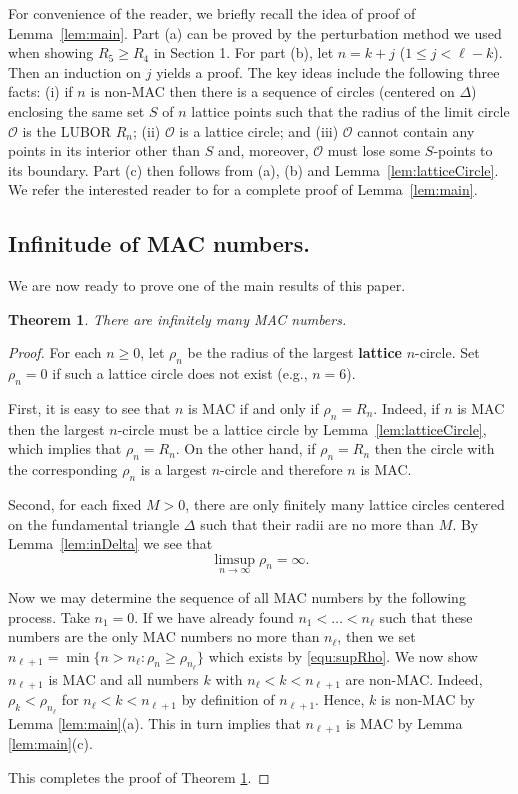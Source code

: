 \documentclass{article}
\theoremstyle{theorem}
\newtheorem{theorem}{Theorem}
\theoremstyle{definition}
\begin{document}
For convenience of the reader, we briefly recall the idea of proof of Lemma~\ref{lem:main}.
Part (a) can be proved by the perturbation method we used when showing $R_5\ge R_4$ in Section 1. For part (b), let $n=k+j$ ($1\le j<\ell-k$). Then an induction on $j$ yields a proof. The key ideas include the following three facts: (i) if $n$ is non-MAC then there is a sequence of circles (centered on $\Delta$) enclosing the same set $S$ of $n$ lattice points such that the radius of the limit circle $\mathcal O$ is the LUBOR $R_n$; (ii) $\mathcal O$ is a lattice circle; and (iii) $\mathcal O$ cannot contain any points in its interior other than $S$ and, moreover, $\mathcal O$ must lose some $S$-points to its boundary. Part (c) then follows from (a), (b) and Lemma~\ref{lem:latticeCircle}. We refer the interested reader to \cite{Zhao2025Aug} for a complete proof of Lemma~\ref{lem:main}.


\subsection{Infinitude of MAC numbers.}
We are now ready to prove one of the main results of this paper.

\begin{theorem}\label{thm:infinityMAC}
There are infinitely many MAC numbers.
\end{theorem}

\begin{proof}
For each $n\ge 0$, let $\rho_n$ be the radius of the largest {\bf lattice} $n$-circle. Set $\rho_n=0$ if such a lattice circle does not exist (e.g., $n=6$).

First, it is easy to see that $n$ is MAC if and only if $\rho_n=R_n$. Indeed, if $n$ is MAC then the largest $n$-circle must be a lattice circle by Lemma~\ref{lem:latticeCircle}, which implies that $\rho_n=R_n$. On the other hand, if $\rho_n=R_n$ then the circle with the corresponding $\rho_n$ is a largest $n$-circle and therefore $n$ is MAC.

Second, for each fixed $M>0$, there are only finitely many lattice circles centered on the fundamental triangle $\Delta$ such that their radii are no more than $M$. By Lemma~\ref{lem:inDelta} we see that
\begin{equation}\label{equ:supRho}
\limsup_{n\to \infty}\rho_n=\infty.
\end{equation}

Now we may determine the sequence of all MAC numbers by the following process. Take $n_1=0$. If we have already found $n_1<\dots<n_\ell$ such that these numbers are the only MAC numbers no more than $n_\ell$, then we set $n_{\ell+1}=\min\{n> n_\ell:\rho_n\ge \rho_{n_\ell}\}$ which exists by \eqref{equ:supRho}. We now show $n_{\ell+1}$ is MAC and all numbers $k$ with $n_\ell<k<n_{\ell+1}$ are non-MAC.
Indeed, $\rho_k<\rho_{n_\ell}$ for $n_\ell<k<n_{\ell+1}$ by definition of $n_{\ell+1}$. Hence, $k$ is non-MAC by Lemma \ref{lem:main}(a). This in turn implies that $n_{\ell+1}$ is MAC by Lemma \ref{lem:main}(c).

This completes the proof of Theorem \ref{thm:infinityMAC}.
\end{proof}
\end{document}

